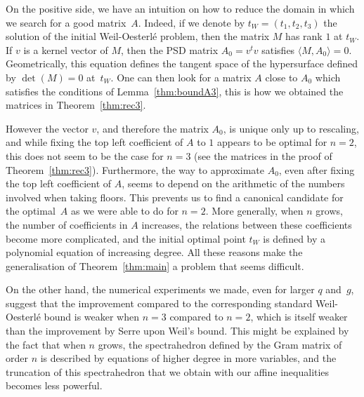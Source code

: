 \documentclass{amsart}
\begin{document}
On the positive side, we have an intuition on how to reduce the domain in which we search for a good matrix~$A$.
Indeed, if we denote by $t_W = (t_1,t_2,t_3)$ the solution of the initial Weil-Oesterl\'e problem, then the matrix $M$ has rank $1$ at $t_W$. 
If $v$ is a kernel vector of $M$, then the PSD matrix $A_0 = v^t v$ satisfies $\langle M, A_0 \rangle = 0$.
Geometrically, this equation defines the tangent space of the hypersurface defined by $\det(M)=0$ at~$t_W$. 
One can then look for a matrix $A$ close to $A_0$ which satisfies the conditions of Lemma~\ref{thm:boundA3}, this is how we obtained the matrices in Theorem~\ref{thm:rec3}. 

However the vector $v$, and therefore the matrix $A_0$, is unique only up to rescaling, and while fixing the top left coefficient of $A$ to $1$ appears to be optimal for $n=2$, this does not seem to be the case for $n =3$ (see the matrices in the proof of Theorem~\ref{thm:rec3}).
Furthermore, the way to approximate $A_0$, even after fixing the top left coefficient of $A$, seems to depend on the arithmetic of the numbers involved when taking floors.
This prevents us to find a canonical candidate for the optimal~$A$ as we were able to do for $n=2$.
More generally, when $n$ grows, the number of coefficients in $A$ increases, the relations between these coefficients become more complicated, and the initial optimal point $t_W$ is defined by a polynomial equation of increasing degree. 
All these reasons make the generalisation of Theorem~\ref{thm:main} a problem that seems difficult.

On the other hand, the numerical experiments we made, even for larger $q$ and~$g$, suggest that the improvement compared to the corresponding standard Weil-Oesterl\'e bound is weaker when $n=3$ compared to $n=2$, which is itself weaker than the improvement by Serre upon Weil's bound.
This might be explained by the fact that when $n$ grows, the spectrahedron
defined by the Gram matrix of order $n$ is described by equations of higher degree in more variables, and the truncation of this spectrahedron that we obtain with our affine inequalities becomes less powerful.








\end{document}
